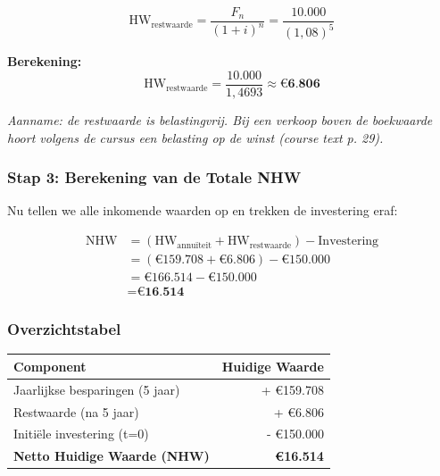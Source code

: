\documentclass[a4paper,11pt]{article}
\begin{document}
\begin{oefenblok}
    \[
        \text{HW}_{\text{restwaarde}} = \frac{F_n}{(1+i)^n} = \frac{10.000}{(1{,}08)^5}
    \]

    \textbf{Berekening:}
    \[
        \text{HW}_{\text{restwaarde}} = \frac{10.000}{1{,}4693} \approx \textbf{€6.806}
    \]

    \textit{Aanname: de restwaarde is belastingvrij. Bij een verkoop boven de boekwaarde hoort volgens de cursus een belasting op de winst (course text p. 29).}

    \subsubsection*{Stap 3: Berekening van de Totale NHW}

    Nu tellen we alle inkomende waarden op en trekken de investering eraf:

    \begin{align*}
        \text{NHW} & = (\text{HW}_{\text{annuïteit}} + \text{HW}_{\text{restwaarde}}) - \text{Investering} \\
                   & = (€159.708 + €6.806) - €150.000                                                      \\
                   & = €166.514 - €150.000                                                                 \\
                   & = \textbf{€16.514}
    \end{align*}

    \subsubsection*{Overzichtstabel}

    \begin{center}
        \begin{tabular}{|l|r|}
            \hline
            \textbf{Component}                  & \textbf{Huidige Waarde} \\
            \hline
            Jaarlijkse besparingen (5 jaar)     & + €159.708              \\
            \hline
            Restwaarde (na 5 jaar)              & + €6.806                \\
            \hline
            Initiële investering (t=0)          & - €150.000              \\
            \hline
            \textbf{Netto Huidige Waarde (NHW)} & \textbf{€16.514}        \\
            \hline
        \end{tabular}
    \end{center}


\end{oefenblok}
\end{document}

